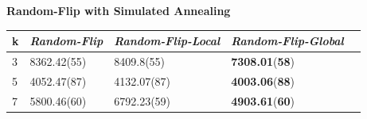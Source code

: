 \documentclass[12pt,a4paper,twoside]{scrartcl}
\numberwithin{equation}{section}
\begin{document}
 \clearpage
\textbf{Random-Flip with Simulated Annealing} 
  \begin{table}[H]
\begin{center}
    \begin{tabular}{|l|l|l|l|p{3cm}|}
\hline 
    k &\emph{Random-Flip}&\emph{Random-Flip-Local}&\emph{Random-Flip-Global} \\ \hline      
    3 &  8362.42(55)&8409.8(55)	&\textbf{7308.01}(\textbf{58})\\ \hline
    5&4052.47(87)&	4132.07(87)&\textbf{4003.06}(\textbf{88}) \\ \hline
    7& 5800.46(60) &6792.23(59) &	\textbf{4903.61}(\textbf{60})\\ \hline	
\end{tabular}
\end{center}
\end{table}
\end{document}

